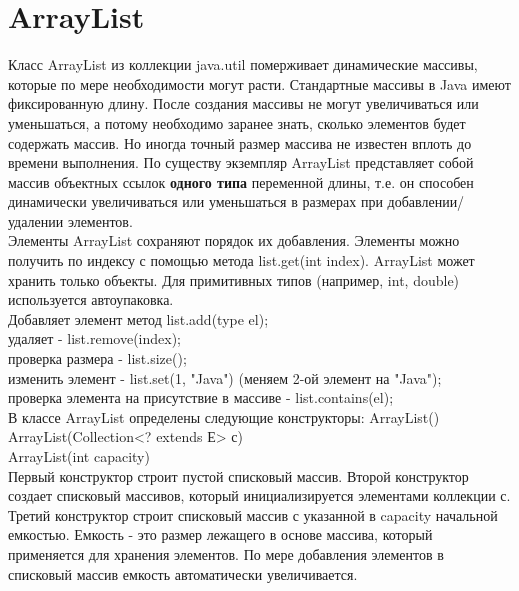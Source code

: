 \section{ArrayList}
Класс ArrayList из коллекции java.util померживает динамические массивы, которые по мере необходимости могут расти. Стандартные массивы в Java имеют фиксированную длину. После создания массивы не могут увеличиваться или уменьшаться, а потому необходимо заранее знать, сколько элементов будет содержать массив. Но иногда точный размер массива не известен вплоть до времени выполнения. По существу экземпляр ArrayList представляет собой массив объектных ссылок \textbf{одного типа} переменной длины, т.е. он способен динамически увеличиваться или уменьшаться в размерах при добавлении/удалении элементов. \\
Элементы ArrayList сохраняют порядок их добавления. Элементы можно получить по индексу с помощью метода list.get(int index). ArrayList может хранить только объекты. Для примитивных типов (например, int, double) используется автоупаковка. \\
Добавляет элемент метод list.add(type el); \\
удаляет - list.remove(index); \\
проверка размера - list.size(); \\
изменить элемент - list.set(1, "Java") (меняем 2-ой элемент на "Java"); \\
проверка элемента на присутствие в массиве - list.contains(el); \\
В классе ArrayList определены следующие конструкторы:
ArrayList() \\
ArrayList(Collection<? extends Е> с) \\
ArrayList(int capacity) \\
Первый конструктор строит пустой списковый массив. Второй конструктор создает списковый массивов, который инициализируется элементами коллекции с. Третий конструктор строит списковый массив с указанной в capacity начальной емкостью. Емкость - это размер лежащего в основе массива, который применяется для хранения элементов. По мере добавления элементов в списковый массив емкость автоматически увеличивается. 
